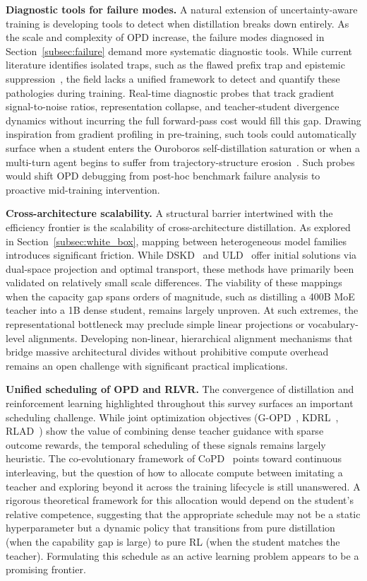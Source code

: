 \documentclass{article} %
\begin{document}
\textbf{Diagnostic tools for failure modes.} A natural extension of uncertainty-aware training is developing tools to detect when distillation breaks down entirely. As the scale and complexity of OPD increase, the failure modes diagnosed in Section~\ref{subsec:failure} demand more systematic diagnostic tools. While current literature identifies isolated traps, such as the flawed prefix trap and epistemic suppression~\citep{2603.24472}, the field lacks a unified framework to detect and quantify these pathologies during training. Real-time diagnostic probes that track gradient signal-to-noise ratios, representation collapse, and teacher-student divergence dynamics without incurring the full forward-pass cost would fill this gap. Drawing inspiration from gradient profiling in pre-training, such tools could automatically surface when a student enters the Ouroboros self-distillation saturation or when a multi-turn agent begins to suffer from trajectory-structure erosion~\citep{ttopd2026}. Such probes would shift OPD debugging from post-hoc benchmark failure analysis to proactive mid-training intervention.

\textbf{Cross-architecture scalability.} A structural barrier intertwined with the efficiency frontier is the scalability of cross-architecture distillation. As explored in Section~\ref{subsec:white_box}, mapping between heterogeneous model families introduces significant friction. While DSKD~\citep{2504.11426} and ULD~\citep{2402.12030} offer initial solutions via dual-space projection and optimal transport, these methods have primarily been validated on relatively small scale differences. The viability of these mappings when the capacity gap spans orders of magnitude, such as distilling a 400B MoE teacher into a 1B dense student, remains largely unproven. At such extremes, the representational bottleneck may preclude simple linear projections or vocabulary-level alignments. Developing non-linear, hierarchical alignment mechanisms that bridge massive architectural divides without prohibitive compute overhead remains an open challenge with significant practical implications.

\textbf{Unified scheduling of OPD and RLVR.} The convergence of distillation and reinforcement learning highlighted throughout this survey surfaces an important scheduling challenge. While joint optimization objectives (G-OPD~\citep{2602.12125}, KDRL~\citep{2506.02208}, RLAD~\citep{2602.22495}) show the value of combining dense teacher guidance with sparse outcome rewards, the temporal scheduling of these signals remains largely heuristic. The co-evolutionary framework of CoPD~\citep{gu2026copd} points toward continuous interleaving, but the question of how to allocate compute between imitating a teacher and exploring beyond it across the training lifecycle is still unanswered. A rigorous theoretical framework for this allocation would depend on the student's relative competence, suggesting that the appropriate schedule may not be a static hyperparameter but a dynamic policy that transitions from pure distillation (when the capability gap is large) to pure RL (when the student matches the teacher). Formulating this schedule as an active learning problem appears to be a promising frontier.
\end{document}

